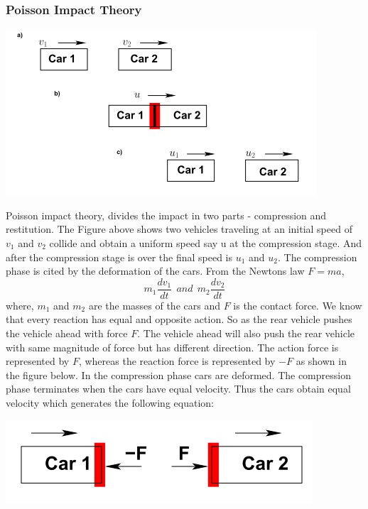 \subsubsection{Poisson Impact Theory}
\begin{center}
	\includegraphics[scale=0.8]{gfx/fig56.png}
\end{center}
Poisson impact theory, divides the impact in two parts - compression and restitution. The Figure above shows two vehicles traveling at an initial speed of $ v_1 $ and $ v_2 $ collide and obtain a uniform speed say u at the compression stage. And after the compression stage is over the final speed is $ u_1 $ and $ u_2 $. The compression phase is cited by the deformation of the cars. From the Newtons law $ F = ma $,
\begin{equation}
	m_1 \frac{dv_1}{dt} \:\: and \:\: m_2 \frac{dv_2}{dt}
\end{equation}
where, $ m_1 $ and $ m_2 $ are the masses of the cars and $ F $ is the contact force. We know that every reaction has equal and opposite action. So as the rear vehicle pushes the vehicle ahead with force $ F $. The vehicle ahead will also push the rear vehicle with same magnitude of force but has different direction. The action force is represented by $ F $, whereas the reaction force is represented by $ -F $ as shown in the figure below. In the compression phase cars are deformed. The compression phase terminates when the cars have equal velocity. Thus the cars obtain equal velocity which generates the following equation:
\begin{center}
	\includegraphics{gfx/fig57.png}
\end{center}
